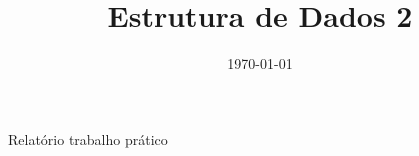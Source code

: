 \documentclass[12pt]{article}
\begin{document}
\title{Estrutura de Dados 2}
\date{\today}

\maketitle

\vspace{40pt}

\begin{center}
Relatório trabalho prático
\end{center}

\vspace{80pt}


\newpage


\newpage


\end{document}
